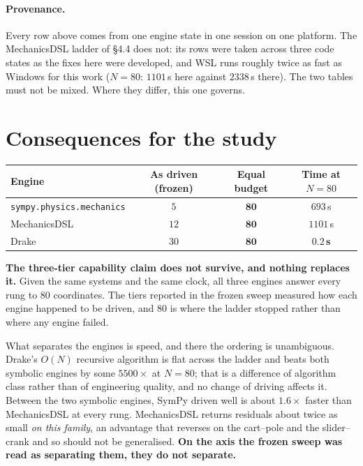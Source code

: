 \documentclass[11pt,a4paper]{article}
\newcommand{\code}[1]{\texttt{\small #1}}
\begin{document}
\paragraph{Provenance.}
Every row above comes from one engine state in one session on one platform.
The MechanicsDSL ladder of \S4.4 does not: its rows were taken across three
code states as the fixes here were developed, and WSL runs roughly twice as
fast as Windows for this work ($N=80$: $1101$\,s here against $2338$\,s
there). The two tables must not be mixed. Where they differ, this one governs.

\section{Consequences for the study}

\begin{center}
\begin{tabular}{@{}lccc@{}}
\toprule
\textbf{Engine} & \textbf{As driven (frozen)} & \textbf{Equal budget} & \textbf{Time at $N=80$} \\
\midrule
\code{sympy.physics.mechanics} & $5$  & $\mathbf{80}$ & $693$\,s \\
MechanicsDSL                   & $12$ & $\mathbf{80}$ & $1101$\,s \\
Drake                          & $30$ & $\mathbf{80}$ & $\mathbf{0.2}$\,\textbf{s} \\
\bottomrule
\end{tabular}
\end{center}

\noindent \textbf{The three-tier capability claim does not survive, and nothing
replaces it.} Given the same systems and the same clock, all three engines
answer every rung to $80$ coordinates. The tiers reported in the frozen sweep
measured how each engine happened to be driven, and $80$ is where the ladder
stopped rather than where any engine failed.

What separates the engines is speed, and there the ordering is unambiguous.
Drake's $O(N)$ recursive algorithm is flat across the ladder and beats both
symbolic engines by some $5500\times$ at $N=80$; that is a difference of
algorithm class rather than of engineering quality, and no change of driving
affects it. Between the two symbolic engines, SymPy driven well is about
$1.6\times$ faster than MechanicsDSL at every rung. MechanicsDSL returns
residuals about twice as small \emph{on this family}, an advantage that reverses
on the cart--pole and the slider--crank and so should not be generalised.
\textbf{On the axis the frozen sweep was read as separating them, they do not
separate.}
\end{document}
